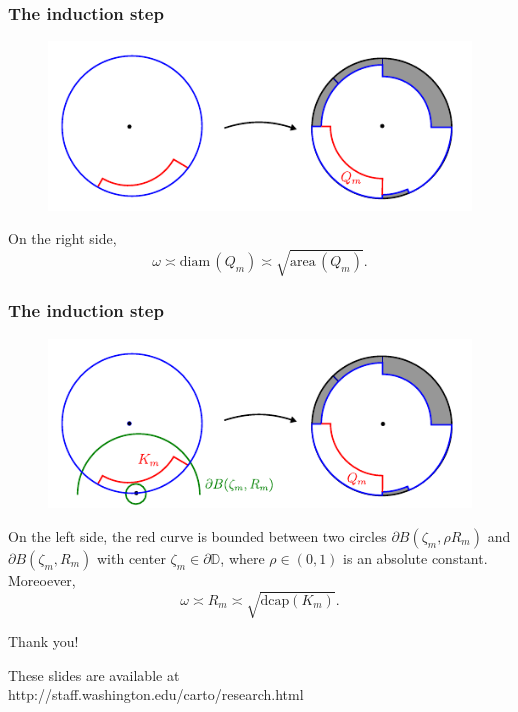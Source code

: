 \documentclass[xcolor=pdftex,dvipsnames,table]{beamer}
\newcommand{\bbD}{\mathbb{D}}
\newcommand{\go}{\omega}
\newcommand{\gz}{\zeta}
\newcommand{\area}{\text{area}\,}
\newcommand{\diam}{\text{diam}\,}
\newcommand{\dcap}{\text{dcap}}
\theoremstyle{definition}
\begin{document}
\begin{frame}
  \frametitle{The induction step}
  \begin{figure}
    \includegraphics[scale=1]{removeOneSquare_03.pdf}
  \end{figure}
  On the right side,
  \[
      \go \asymp \diam(Q_m) \asymp \sqrt{\area(Q_m)}.
  \]
\end{frame}

\begin{frame}
  \frametitle{The induction step}
  \begin{figure}
    \includegraphics[scale=1]{removeOneSquare_04.pdf}
  \end{figure}
  On the left side, the red curve is bounded between two circles $\partial B(\gz_m, \rho R_m)$ and $\partial B(\gz_m, R_m)$
  with center $\gz_m \in \partial \bbD$, where {\color{blue} $\rho \in (0,1)$ is an absolute constant}. Moreoever,
  \[
      \go \asymp R_m \asymp \sqrt{\dcap(K_m)}.
  \]
\end{frame}

\begin{frame}
  \begin{center}
    \huge{Thank you!}
  \end{center}
  \vspace{.2in}
  These slides are available at\\
  {\color{blue} http://staff.washington.edu/carto/research.html}  
\end{frame}
\end{document}
